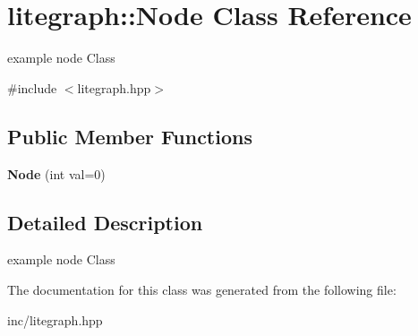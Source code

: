 \hypertarget{classlitegraph_1_1Node}{}\section{litegraph\+:\+:Node Class Reference}
\label{classlitegraph_1_1Node}


example node Class  




{\ttfamily \#include $<$litegraph.\+hpp$>$}

\subsection*{Public Member Functions}
\begin{DoxyCompactItemize}
\item 
\mbox{\label{classlitegraph_1_1Node_a455e0290ddccd7b4d623cb0cde98d9bf}} 
{\bfseries Node} (int val=0)
\end{DoxyCompactItemize}


\subsection{Detailed Description}
example node Class 

The documentation for this class was generated from the following file\+:\begin{DoxyCompactItemize}
\item 
inc/litegraph.\+hpp\end{DoxyCompactItemize}
